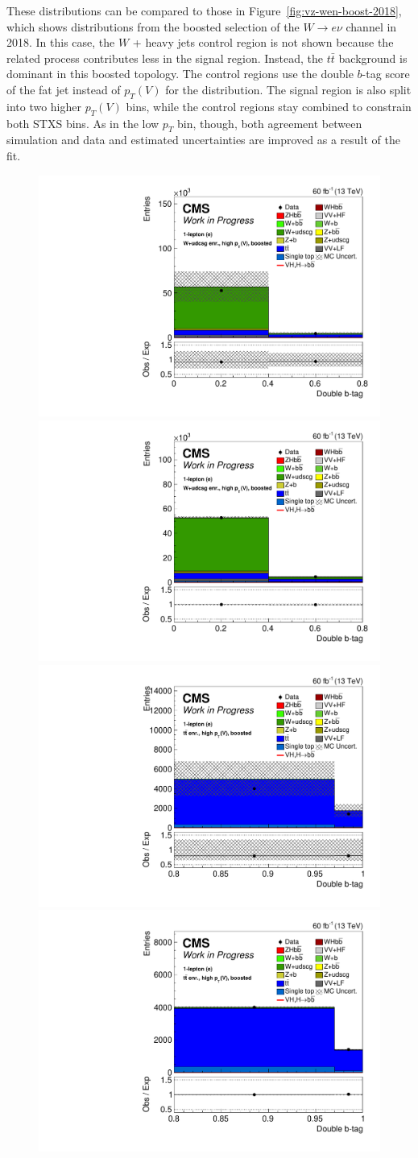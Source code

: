 %
These distributions can be compared to those in Figure~\ref{fig:vz-wen-boost-2018},
which shows distributions from the boosted selection of the $W\rightarrow e\nu$ channel in 2018.
In this case, the $W$ + heavy jets control region is not shown because the related process contributes less
in the signal region.
Instead, the $t\bar{t}$ background is dominant in this boosted topology.
The control regions use the double $b$-tag score of the fat jet instead of $p_T(V)$ for the distribution.
The signal region is also split into two higher $p_T(V)$ bins, while the control regions stay combined
to constrain both STXS bins.
As in the low $p_T$ bin, though, both agreement between simulation and data and estimated uncertainties
are improved as a result of the fit.
%
\begin{figure}
  \centering
  \includegraphics[width=0.35\linewidth]{figures/210323_STXS_VZ_unblinded_XbbVZ_8fe9e9cd_postfitplots/plot_shapes_vhbb_Wen_18_13TeV2018_prefit}
  \includegraphics[width=0.35\linewidth]{figures/210323_STXS_VZ_unblinded_XbbVZ_8fe9e9cd_postfitplots/plot_shapes_vhbb_Wen_18_13TeV2018_postfit} \\
  \includegraphics[width=0.35\linewidth]{figures/210323_STXS_VZ_unblinded_XbbVZ_8fe9e9cd_postfitplots/plot_shapes_vhbb_Wen_20_13TeV2018_prefit}
  \includegraphics[width=0.35\linewidth]{figures/210323_STXS_VZ_unblinded_XbbVZ_8fe9e9cd_postfitplots/plot_shapes_vhbb_Wen_20_13TeV2018_postfit} \\

\end{figure}
